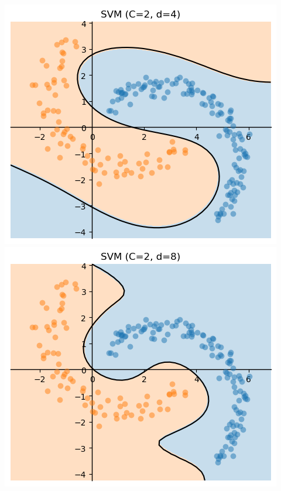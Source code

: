 \documentclass[10pt,aspectratio=169,handout]{beamer}
\begin{document}
\begin{frame}
\begin{columns}
\begin{column}{0.3\textwidth}
            \includegraphics[height=0.4\textheight]{images/task5-4-d_4.png}
            \includegraphics[height=0.4\textheight]{images/task5-4-d_8.png}
        \end{column}    
        \begin{column}{0.3\textwidth}
            \centering

\end{column}
\end{columns}
\end{frame}
\end{document}
